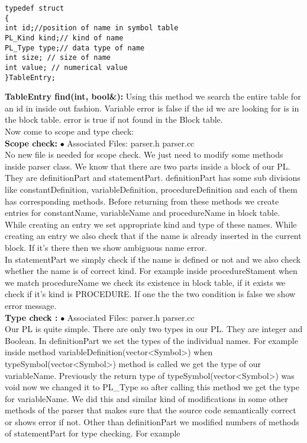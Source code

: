 \documentclass[paper=letter, fontsize=12pt]{scrartcl} %
\begin{document}
\begin{lstlisting}
typedef struct
{
int id;//position of name in symbol table
PL_Kind kind;// kind of name
PL_Type type;// data type of name
int size; // size of name
int value; // numerical value
}TableEntry;
\end{lstlisting}
\pagebreak
{\bf TableEntry find(int, bool\&):} Using this method we search the entire table for an id in inside out fashion. Variable error is false if the id we are looking for is in
the block table. error is true if not found in the Block table.\\

Now come to scope and type check:\\

{\bf Scope check:}
$\bullet$ Associated Files: parser.h parser.cc\\
No new file is needed for scope check. We just need to modify some methods inside parser class. We know that there are two parts inside a block of our PL. They are definitionPart and statementPart. definitionPart has some sub divisions like constantDefinition, variableDefinition, procedureDefinition and each of them has corresponding methods. Before returning from these methods we create entries for constantName, variableName and procedureName in  block table. While creating an entry we set appropriate kind and type of these names. While creating an entry we also check that if the name is already inserted in the current block. If it's there then we show ambiguous name error.\\
In statementPart we simply check if the name is defined or not and we also check whether the name is of correct kind. For example inside procedureStament when we match procedureName we check its existence in block table, if it exists we check if it's kind is PROCEDURE. If one the the two condition is false we show error message. \\

{\bf Type check :}      
$\bullet$ Associated Files: parser.h parser.cc\\
Our PL is quite simple. There are only two types in our PL. They are integer and Boolean. In definitionPart we set the types of the individual names. For example inside method variableDefinition(vector<Symbol>) when typeSymbol(vector<Symbol>) method is  called we get the type of our variableName. Previously the return type of typeSymbol(vector<Symbol>) was void now we changed it to PL\_Type so after calling this method we get the type for variableName. We did this and similar kind of modifications in some other methods of the parser that makes sure that the source code semantically correct or shows error if not. Other than definitionPart we modified numbers of methods of statementPart for type checking. For example\\
\end{document}
